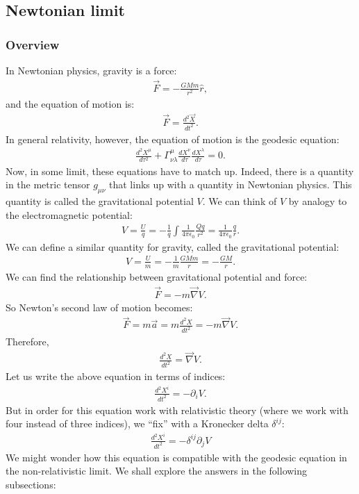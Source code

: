 \documentclass{article}
\theoremstyle{definition}
\begin{document}
\subsection{Newtonian limit}
\subsubsection{Overview}
In Newtonian physics, gravity is a force:
\begin{align*}
\vec{F} = -\frac{GMm}{r^2}\hat{r},
\end{align*}
and the equation of motion is:
\begin{align*}
\vec{F} = \frac{d^2\vec{X}}{dt^2}.
\end{align*}
In general relativity, however, the equation of motion is the geodesic equation:
\begin{align*}
\frac{d^2X^\mu}{d\tau^2} + \Gamma^\mu_{\nu\lambda}\frac{dX^\nu}{d\tau}\frac{dX^\lambda}{d\tau} = 0.
\end{align*}
Now, in some limit, these equations have to match up. Indeed, there is a quantity in the metric tensor $g_{\mu\nu}$ that links up with a quantity in Newtonian physics. This quantity is called the gravitational potential $V$. We can think of $V$ by analogy to the electromagnetic potential:
\begin{align*}
V = \frac{U}{q} = -\frac{1}{q}\int\frac{1}{4\pi\epsilon_0}\frac{Qq}{r^2} = \frac{1}{4\pi\epsilon_0}\frac{q}{r}.
\end{align*}
We can define a similar quantity for gravity, called the gravitational potential:
\begin{align*}
V = \frac{U}{m} = -\frac{1}{m}\frac{GMm}{r}= -\frac{GM}{r}.
\end{align*}
We can find the relationship between gravitational potential and force:
\begin{align*}
\vec{F} = -m\vec{\nabla}V.
\end{align*}
So Newton's second law of motion becomes:
\begin{align*}
\vec{F} = m\vec{a} = m\frac{d^2X}{dt^2} = -m\vec{\nabla}V.
\end{align*}
Therefore,
\begin{align*}
\frac{d^2X}{dt^2} = \vec{\nabla}V.
\end{align*}
Let us write the above equation in terms of indices:
\begin{align*}
\frac{d^2X^i}{dt^2} = -\partial_iV.
\end{align*}
But in order for this equation work with relativistic theory (where we work with four instead of three indices), we ``fix'' with a Kronecker delta $\delta^{ij}$:
\begin{align*}
\boxed{\frac{d^2X^i}{dt^2} = -\delta^{ij}\partial_jV}
\end{align*}
We might wonder how this equation is compatible with the geodesic equation in the non-relativistic limit. We shall explore the answers in the following subsections:
\end{document}
